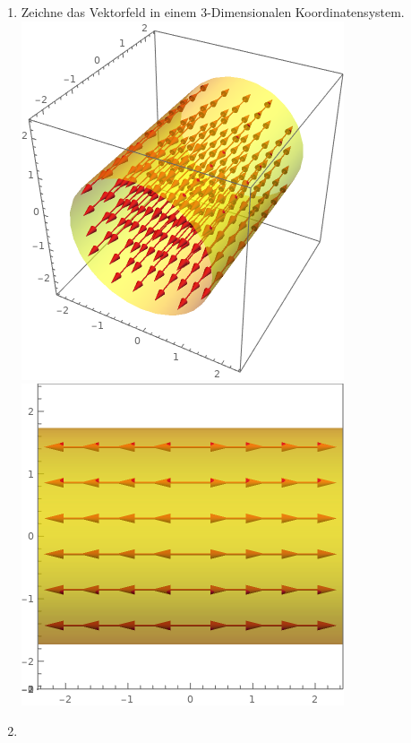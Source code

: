 						\begin{enumerate}
							\item  Zeichne das Vektorfeld in einem 3-Dimensionalen Koordinatensystem. \\
							\includegraphics[scale=0.4]{plot.png}
							\includegraphics[scale=0.4]{plot2.png}
							\item
						\end{enumerate}
					\iend
